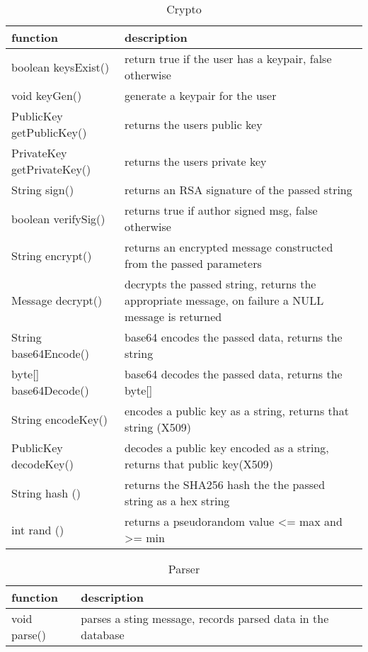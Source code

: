 \begin{table}[h]
    \centering
    \begin{tabular}{p{4.3cm}p{9cm}}
    function                   & description\\ \hline
    boolean keysExist()        & return true if the user has a keypair, false otherwise\\
    void keyGen()              & generate a keypair for the user\\
    PublicKey getPublicKey()   & returns the users public key\\
    PrivateKey getPrivateKey() & returns the users private key\\

    String sign()         & returns an RSA signature of the passed string\\
    boolean verifySig()   & returns true if author signed msg, false otherwise\\
    String encrypt()      & returns an encrypted message constructed from the passed parameters\\
    Message decrypt()     & decrypts the passed string, returns the appropriate message, on failure a NULL message is returned\\
    String base64Encode() & base64 encodes the passed data, returns the string\\
    byte[] base64Decode() & base64 decodes the passed data, returns the byte[]\\
    String encodeKey()    & encodes a public key as a string, returns that string (X509)\\
    PublicKey decodeKey() & decodes a public key encoded as a string, returns that public key(X509)\\
    String hash ()        & returns the SHA256 hash the the passed string as a hex string\\
    int rand ()           & returns a pseudorandom value <= max and >= min\\
    \end{tabular}
    \caption{Crypto}
\end{table}

\begin{table}[h]
    \centering
    \begin{tabular}{p{3.6cm}p{9cm}}
    function     & description\\ \hline
    void parse() & parses a sting message, records parsed data in the database\\
    \end{tabular}
    \caption{Parser}
\end{table}


